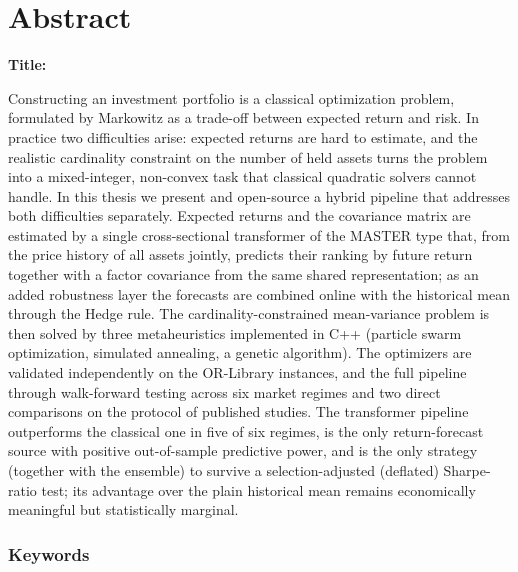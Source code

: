 \chapter*{Abstract}

\noindent\textbf{Title:} \ttitleEn
\bigskip

Constructing an investment portfolio is a classical optimization problem, formulated by Markowitz as a trade-off between expected return and risk. In practice two difficulties arise: expected returns are hard to estimate, and the realistic cardinality constraint on the number of held assets turns the problem into a mixed-integer, non-convex task that classical quadratic solvers cannot handle. In this thesis we present and open-source a hybrid pipeline that addresses both difficulties separately. Expected returns and the covariance matrix are estimated by a single cross-sectional transformer of the MASTER type that, from the price history of all assets jointly, predicts their ranking by future return together with a factor covariance from the same shared representation; as an added robustness layer the forecasts are combined online with the historical mean through the Hedge rule. The cardinality-constrained mean-variance problem is then solved by three metaheuristics implemented in C++ (particle swarm optimization, simulated annealing, a genetic algorithm). The optimizers are validated independently on the OR-Library instances, and the full pipeline through walk-forward testing across six market regimes and two direct comparisons on the protocol of published studies. The transformer pipeline outperforms the classical one in five of six regimes, is the only return-forecast source with positive out-of-sample predictive power, and is the only strategy (together with the ensemble) to survive a selection-adjusted (deflated) Sharpe-ratio test; its advantage over the plain historical mean remains economically meaningful but statistically marginal.

\subsection*{Keywords}
\textit{\tkeywordsEn}
\clearemptydoublepage